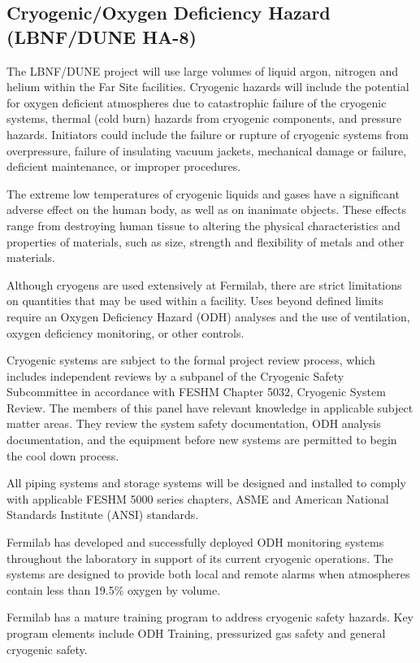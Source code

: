 \subsection{Cryogenic/Oxygen Deficiency Hazard (LBNF/DUNE HA-8)}

The LBNF/DUNE project will use large volumes of liquid argon, nitrogen
and helium within the Far Site facilities. Cryogenic hazards will
include the potential for oxygen deficient atmospheres due to
catastrophic failure of the cryogenic systems, thermal (cold burn)
hazards from cryogenic components, and pressure hazards. Initiators
could include the failure or rupture of cryogenic systems from
overpressure, failure of insulating vacuum jackets, mechanical damage
or failure, deficient maintenance, or improper procedures.

The extreme low temperatures of cryogenic liquids and gases have a
significant adverse effect on the human body, as well as on inanimate
objects. These effects range from destroying human tissue to altering
the physical characteristics and properties of materials, such as
size, strength and flexibility of metals and other materials.

Although cryogens are used extensively at Fermilab, there are strict
limitations on quantities that may be used within a facility. Uses
beyond defined limits require an Oxygen Deficiency Hazard (ODH)
analyses and the use of ventilation, oxygen deficiency monitoring, or
other controls.

Cryogenic systems are subject to the formal project review process,
which includes independent reviews by a subpanel of the Cryogenic
Safety Subcommittee in accordance with FESHM Chapter 5032, Cryogenic
System Review. The members of this panel have relevant knowledge in
applicable subject matter areas. They review the system safety
documentation, ODH analysis documentation, and the equipment before
new systems are permitted to begin the cool down process.

All piping systems and storage systems will be designed and installed
to comply with applicable FESHM 5000 series chapters, ASME and
American National Standards Institute (ANSI) standards.

Fermilab has developed and successfully deployed ODH monitoring systems throughout the laboratory in support of its current cryogenic operations. The systems are designed to provide both local and remote alarms when atmospheres contain less than 19.5\% oxygen by volume.

Fermilab has a mature training program to address cryogenic safety
hazards. Key program elements include ODH Training, pressurized gas
safety and general cryogenic safety.


